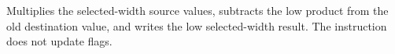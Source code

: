 Multiplies the selected-width source values, subtracts the low product from the old destination value, and writes
the low selected-width result. The instruction does not update flags.
